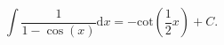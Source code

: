 $$ 
  \int \frac{1}{1 - \cos(x)} \mathrm{d}x
  = - \mathrm{cot} \left ( \frac{1}{2} x \right ) + C .
  $$